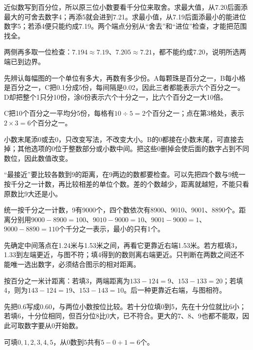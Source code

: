 \documentclass[multi=snippet,border=0pt]{standalone}
\newenvironment{snippet}[3]{\begin{minipage}{#1bp}\color{answerred}\fontsize{#2}{#3}\selectfont\raggedright}{\end{minipage}}
\begin{document}
\begin{snippet}{505}{11.5}{14}近似数写到百分位，所以原三位小数要看千分位来取舍。求最大值，从7.20后面添最大的可舍去数字4；再添5就会进到7.21。求最小值，从7.19后面添最小的能进位数字5；若添4便只能约成7.19。两个端点分别从“舍去”和“进位”检查，才能把范围找全。\par 两侧再多取一位检查：\(7.194\approx7.19\)、\(7.205\approx7.21\)，都不能约成7.20，说明所选两端已到边界。\end{snippet}
\begin{snippet}{505}{11.5}{14}先辨认每幅图的一个单位有多大，再数有多少份。A每颗珠是百分之一，B每小格是百分之一，C把0.1分成5份，每间隔是0.02，因此三者都能表示六个百分之一。D却把整个1只分10份，涂6份表示六个十分之一，比六个百分之一大10倍。\par C把10个百分之一平均分5份，每格有\(10\div5=2\)个百分之一；点在第3格处，表示\(2\times3=6\)个百分之一。\end{snippet}
\begin{snippet}{505}{11.5}{14}小数末尾添0或去0，只改变写法，不改变大小。B的0都接在小数末尾，可直接去掉；其他选项的0位于整数部分或小数中间。把这些0删掉会使后面的数字占到不同数位，因此数值改变。\end{snippet}
\begin{snippet}{505}{11.5}{14}“最接近”要比较各数到9的距离，在9两边的数都要检查。可以先把四个数与9统一按千分之一计数，再比较相差的单位个数。差的个数越少，距离就越短，不能只看原数比9大还是小。\par 统一按千分之一计数，9有9000个，四个数依次有8900、9010、9001、8890个。距离分别用\(9000-8900=100\)、\(9010-9000=10\)、\(9001-9000=1\)、\(9000-8890=110\)个千分之一表示，最小的只有1个。\end{snippet}
\begin{snippet}{505}{11.5}{14}先确定中间落点在1.24米与1.53米之间，再看它更靠近右端1.53米。若方框填3，1.33到左端更近，与图不符；填4得到的数则离右端更近。只判断在两数之间还不能唯一选出数字，必须结合图示的相对距离。\par 按百分之一米计距离：若填3，两端距离为\(133-124=9\)、\(153-133=20\)；若填4，则为\(143-124=19\)、\(153-143=10\)。后一种更靠近右端，与图相符。\end{snippet}
\begin{snippet}{505}{11.5}{14}先把0.6写成0.60，与两位小数按位比较。若十分位填0到5，先在十分位就比6小；若填6，十分位相同，但百分位8比0大，已不符合。更大的7、8、9也都不能取，因此可取数字要从0开始数。\par 可填\(0,1,2,3,4,5\)，从0数到5共有\(5-0+1=6\)个。\end{snippet}
\end{document}
